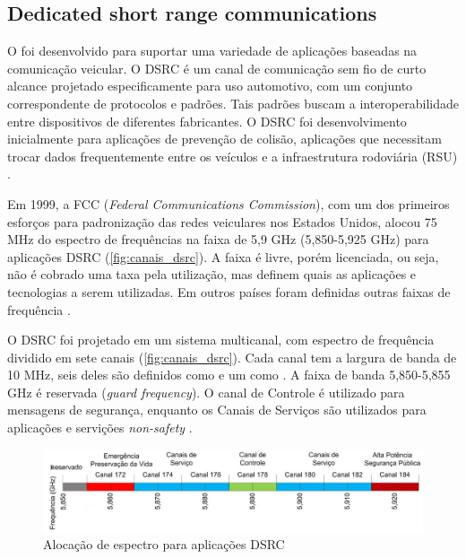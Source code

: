 \documentclass[mestrado, pre-defesa, english, brazil]{packages/icmc}
\begin{document}
\subsection{Dedicated short range communications} \label{dsrc}

O  foi desenvolvido para suportar uma variedade de aplicações baseadas na comunicação veicular. O DSRC é um canal de comunicação sem fio de curto alcance projetado especificamente para uso automotivo, com um conjunto correspondente de protocolos e padrões. Tais padrões buscam a interoperabilidade entre dispositivos de diferentes fabricantes. O  DSRC foi desenvolvimento inicialmente para aplicações de prevenção de colisão, aplicações que necessitam trocar dados frequentemente entre os veículos e a infraestrutura rodoviária (RSU) \cite{kenney-2011,Alves-2009}.

Em 1999, a FCC (\textit{Federal Communications Commission}), com um dos primeiros esforços para padronização das redes veiculares nos Estados Unidos, alocou 75 MHz do espectro de frequências na faixa de 5,9 GHz (5,850-5,925 GHz) para aplicações DSRC (\autoref{fig:canais_dsrc}). A faixa é livre, porém licenciada, ou seja, não é cobrado uma taxa pela utilização, mas definem quais as aplicações e tecnologias a serem utilizadas. Em outros países foram definidas outras faixas de frequência \cite{Alves-2009,li-2012,kenney-2011}.

O DSRC foi projetado em um sistema multicanal, com espectro de frequência dividido em sete canais (\autoref{fig:canais_dsrc}). Cada canal tem a largura de banda de 10 MHz, seis deles são definidos como  e um como . A faixa de banda 5,850-5,855 GHz é reservada (\textit{guard frequency}). O canal de Controle é utilizado para mensagens de segurança, enquanto os Canais de Serviços são utilizados para aplicações e servições \textit{non-safety} \cite{sattari-2012,li-2012}.

\begin{figure}[!htbp]
    \centering
    \caption{\label{fig:canais_dsrc} Alocação de espectro para aplicações DSRC}
    \includegraphics[width=15cm]{img/canais-dsrc2.jpeg}
\end{figure}
\end{document}
